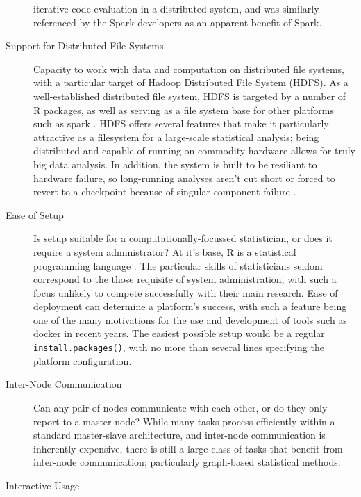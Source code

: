 \documentclass[a4paper,10pt]{article}
\begin{document}
\begin{description}
      iterative code evaluation in a distributed system, and was
      similarly referenced by the Spark developers as an
      apparent benefit of Spark\cite{zaharia2010spark}.
\item[Support for Distributed File Systems]
      Capacity to work with data and computation on distributed file
      systems, with a particular target of Hadoop Distributed File System
      (HDFS).
      As a well-established distributed file system, HDFS is targeted
      by a number of R packages, as well as serving as a file
      system base for other platforms such as spark
      \cite{analytics:_rhadoop_wiki} \cite{deltarho:_rhipe}
      \cite{urbanek20} \cite{zaharia2016apache}.
      HDFS offers several features that make it particularly
      attractive as a filesystem for a large-scale statistical
      analysis;
      being distributed and capable of running on commodity hardware
      allows for truly big data analysis.
      In addition, the system is built to be resiliant to hardware
      failure, so long-running analyses aren't cut short or forced to
      revert to a checkpoint because of singular component failure
      \cite{shvachko2010hadoop}.
\item[Ease of Setup]
      Is setup suitable for a computationally-focussed
      statistician, or does it require a system administrator?
      At it's base, R is a statistical programming language
      \cite{rcore2020intro}.
      The particular skills of statisticians seldom correspond to the
      those requisite of system administration, with such a focus
      unlikely to compete successfully with their main research.
      Ease of deployment can determine a platform's success, with
      such a feature being one of the many motivations for the use
      and development of tools such as docker in recent years.
      The easiest possible setup would be a regular
      \texttt{install.packages()}, with no more than several lines
      specifying the platform configuration.
\item[Inter-Node Communication]
      Can any pair of nodes communicate with each other, or do they
      only report to a master node?
      While many tasks process efficiently within a standard
      master-slave architecture, and inter-node communication is
      inherently expensive, there is still a large class of tasks
      that benefit from inter-node communication\cite{walker1996mpi};
      particularly graph-based statistical methods.
\item[Interactive Usage]

\end{description}
\end{document}
